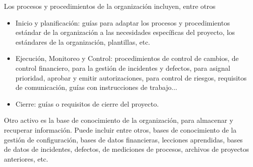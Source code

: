 Los procesos y procedimientos de la organización incluyen, entre otros
\begin{itemize}
\item{Inicio y planificación: guías para adaptar los procesos y procedimientos estándar de la organización a las necesidades específicas del proyecto, los estándares de la organización, plantillas, etc.}
\item{Ejecución, Monitoreo y Control: procedimientos de control de cambios, de control financiero, para la gestión de incidentes y defectos, para asignal prioridad, aprobar y emitir autorizaciones, para control de riesgos, requisitos de comunicación, guías con instrucciones de trabajo...}
\item{Cierre: guías o requisitos de cierre del proyecto.}
\end{itemize}

Otro activo es la base de conocimiento de la organización, para almacenar y recuperar información. Puede incluir entre otros, bases de conocimiento de la gestión de configuración, bases de datos financieras, lecciones aprendidas, bases de datos de incidentes, defectos, de mediciones de procesos, archivos de proyectos anteriores, etc.

